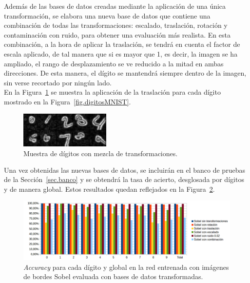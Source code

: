 Además de las bases de datos creadas mediante la aplicación de una única transformación, se elabora una nueva base de datos que contiene una combinación de todas las transformaciones: escalado, traslación, rotación y contaminación con ruido, para obtener una evaluación más realista. En esta combinación, a la hora de aplicar la traslación, se tendrá en cuenta el factor de escala aplicado, de tal manera que si es mayor que 1, es decir, la imagen se ha ampliado, el rango de desplazamiento se ve reducido a la mitad en ambas direcciones. De esta manera, el dígito se mantendrá siempre dentro de la imagen, sin verse recortado por ningún lado.\\

En la Figura~\ref{fig.mix} se muestra la aplicación de la traslación para cada dígito mostrado en la Figura~\ref{fig.digitosMNIST}.
\begin{figure}[H]
	\begin{center}
		\includegraphics[width=0.4\textwidth]{figures/mix}
		\caption{Muestra de dígitos con mezcla de transformaciones.}
		\label{fig.mix}
	\end{center}
\end{figure}

Una vez obtenidas las nuevas bases de datos, se incluirán en el banco de pruebas de la Sección~\ref{sec.banco} y se obtendrá la tasa de acierto, desglosada por dígitos y de manera global. Estos resultados quedan reflejados en la Figura~\ref{fig.sobelEval}.

\begin{figure}[H]
	\begin{center}
		\includegraphics[width=1\textwidth]{figures/sobelev}
		\caption{\textit{Accuracy} para cada dígito y global en la red entrenada con imágenes de bordes Sobel evaluada con bases de datos transformadas.}
		\label{fig.sobelEval}
	\end{center}
\end{figure}

